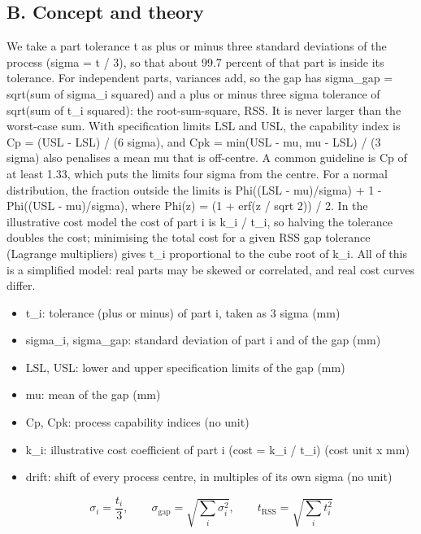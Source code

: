 \documentclass[11pt,a4paper]{article}
\begin{document}
\subsection*{B. Concept and theory}
We take a part tolerance t as plus or minus three standard deviations of the process (sigma = t / 3), so that about 99.7 percent of that part is inside its tolerance. For independent parts, variances add, so the gap has sigma\_gap = sqrt(sum of sigma\_i squared) and a plus or minus three sigma tolerance of sqrt(sum of t\_i squared): the root-sum-square, RSS. It is never larger than the worst-case sum. With specification limits LSL and USL, the capability index is Cp = (USL - LSL) / (6 sigma), and Cpk = min(USL - mu, mu - LSL) / (3 sigma) also penalises a mean mu that is off-centre. A common guideline is Cp of at least 1.33, which puts the limits four sigma from the centre. For a normal distribution, the fraction outside the limits is Phi((LSL - mu)/sigma) + 1 - Phi((USL - mu)/sigma), where Phi(z) = (1 + erf(z / sqrt 2)) / 2. In the illustrative cost model the cost of part i is k\_i / t\_i, so halving the tolerance doubles the cost; minimising the total cost for a given RSS gap tolerance (Lagrange multipliers) gives t\_i proportional to the cube root of k\_i. All of this is a simplified model: real parts may be skewed or correlated, and real cost curves differ.

\begin{itemize}[nosep]
\item t\_i: tolerance (plus or minus) of part i, taken as 3 sigma (mm)
\item sigma\_i, sigma\_gap: standard deviation of part i and of the gap (mm)
\item LSL, USL: lower and upper specification limits of the gap (mm)
\item mu: mean of the gap (mm)
\item Cp, Cpk: process capability indices (no unit)
\item k\_i: illustrative cost coefficient of part i (cost = k\_i / t\_i) (cost unit x mm)
\item drift: shift of every process centre, in multiples of its own sigma (no unit)
\end{itemize}

\begin{equation*}
\sigma_i = \frac{t_i}{3},\qquad \sigma_{\mathrm{gap}} = \sqrt{\sum_i \sigma_i^2},\qquad t_{\mathrm{RSS}} = \sqrt{\sum_i t_i^2}
\end{equation*}
\end{document}
